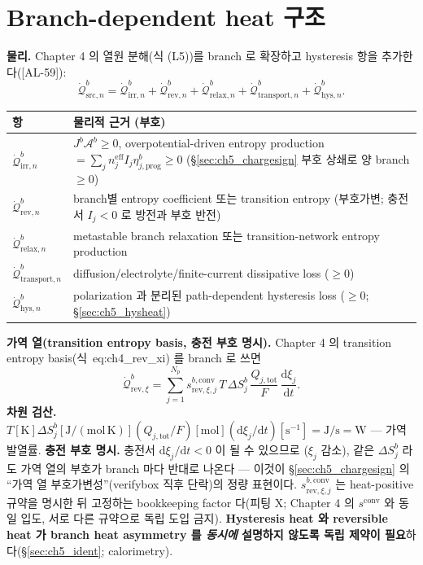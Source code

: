 \documentclass[11pt,a4paper]{article}
\newcommand{\dd}{\mathrm{d}}
\newcommand{\eff}{\mathrm{eff}}
\newcommand{\tot}{\mathrm{tot}}
\newcommand{\irr}{\mathrm{irr}}
\newcommand{\rev}{\mathrm{rev}}
\newcommand{\src}{\mathrm{src}}
\newcommand{\rlx}{\mathrm{relax}}
\newcommand{\prog}{\mathrm{prog}}
\newcommand{\conv}{\mathrm{conv}}
\newcommand{\transp}{\mathrm{transport}}
\newcommand{\hys}{\mathrm{hys}}
\newcommand{\AL}[1]{\textsf{[AL-#1]}}
\begin{document}
\section{Branch-dependent heat 구조}\label{sec:ch5_branchheat}
\textbf{물리.} Chapter 4 의 열원 분해(식 (L5))를 branch 로 확장하고 hysteresis 항을 추가한다(\AL{59}):
\begin{equation}
\dot{\mathcal Q}_{\src,n}^b=\dot{\mathcal Q}_{\irr,n}^b+\dot{\mathcal Q}_{\rev,n}^b+\dot{\mathcal Q}_{\rlx,n}^b
+\dot{\mathcal Q}_{\transp,n}^b+\dot{\mathcal Q}_{\hys,n}^b.
\label{eq:ch5_branch_heat}
\end{equation}
\begin{longtable}{p{} >{\raggedright\arraybackslash}p{}}
\toprule 항 & 물리적 근거 (부호) \\ \midrule \endhead
$\dot{\mathcal Q}_{\irr,n}^b$ & $J^b\mathcal A^b\ge0$, overpotential-driven entropy production $=\sum_j n_j^{\eff}I_j\eta_{j,\prog}^b\ge0$ (\S\ref{sec:ch5_chargesign} 부호 상쇄로 양 branch $\ge0$) \\
$\dot{\mathcal Q}_{\rev,n}^b$ & branch별 entropy coefficient 또는 transition entropy (부호가변; 충전서 $I_j<0$ 로 방전과 부호 반전) \\
$\dot{\mathcal Q}_{\rlx,n}^b$ & metastable branch relaxation 또는 transition-network entropy production \\
$\dot{\mathcal Q}_{\transp,n}^b$ & diffusion/electrolyte/finite-current dissipative loss ($\ge0$) \\
$\dot{\mathcal Q}_{\hys,n}^b$ & polarization 과 분리된 path-dependent hysteresis loss ($\ge0$; \S\ref{sec:ch5_hysheat}) \\
\bottomrule
\end{longtable}
\textbf{가역 열(transition entropy basis, 충전 부호 명시).} Chapter 4 의 transition entropy basis(식~eq:ch4\_rev\_xi)
를 branch 로 쓰면
\begin{equation}
\dot{\mathcal Q}_{\rev,\xi}^b=\sum_{j=1}^{N_p}s_{\rev,\xi,j}^{b,\conv}\,T\,\Delta S_j^b\,\frac{Q_{j,\tot}}{F}\,\frac{\dd\xi_j}{\dd t}.
\label{eq:ch5_branch_rev}
\end{equation}
\textbf{차원 검산.} $T[\mathrm K]\Delta S_j^b[\mathrm{J/(mol\,K)}](Q_{j,\tot}/F)[\mathrm{mol}](\dd\xi_j/\dd t)[\mathrm{s^{-1}}]
=\mathrm{J/s}=\mathrm W$ — 가역 발열률. \textbf{충전 부호 명시.} 충전서 $\dd\xi_j/\dd t<0$ 이 될 수 있으므로
($\xi_j$ 감소), 같은 $\Delta S_j^b$ 라도 가역 열의 부호가 branch 마다 반대로 나온다 — 이것이
\S\ref{sec:ch5_chargesign} 의 ``가역 열 부호가변성''(verifybox 직후 단락)의 정량 표현이다. $s_{\rev,\xi,j}^{b,\conv}$
는 heat-positive 규약을 명시한 뒤 고정하는 bookkeeping factor 다(피팅 X; Chapter 4 의 $s^\conv$ 와 동일 입도,
서로 다른 규약으로 독립 도입 금지). \textbf{Hysteresis heat 와 reversible heat 가 branch heat asymmetry 를
\emph{동시에} 설명하지 않도록 독립 제약이 필요}하다(\S\ref{sec:ch5_ident}; calorimetry).
\end{document}
